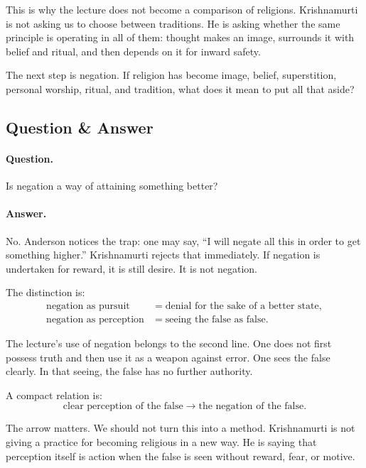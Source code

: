 This is why the lecture does not become a comparison of religions. Krishnamurti is not asking us to choose between traditions. He is asking whether the same principle is operating in all of them: thought makes an image, surrounds it with belief and ritual, and then depends on it for inward safety.

The next step is negation. If religion has become image, belief, superstition, personal worship, ritual, and tradition, what does it mean to put all that aside?

\subsection{Question \& Answer}

\paragraph{Question.}
Is negation a way of attaining something better?

\paragraph{Answer.}
No. Anderson notices the trap: one may say, ``I will negate all this in order to get something higher.'' Krishnamurti rejects that immediately. If negation is undertaken for reward, it is still desire. It is not negation.

The distinction is:
\begin{align}
\text{negation as pursuit}
&=
\text{denial for the sake of a better state},\\
\text{negation as perception}
&=
\text{seeing the false as false}.
\end{align}

The lecture's use of negation belongs to the second line. One does not first possess truth and then use it as a weapon against error. One sees the false clearly. In that seeing, the false has no further authority.

A compact relation is:
\begin{equation}
\text{clear perception of the false}
\longrightarrow
\text{the negation of the false}.
\end{equation}

The arrow matters. We should not turn this into a method. Krishnamurti is not giving a practice for becoming religious in a new way. He is saying that perception itself is action when the false is seen without reward, fear, or motive.

